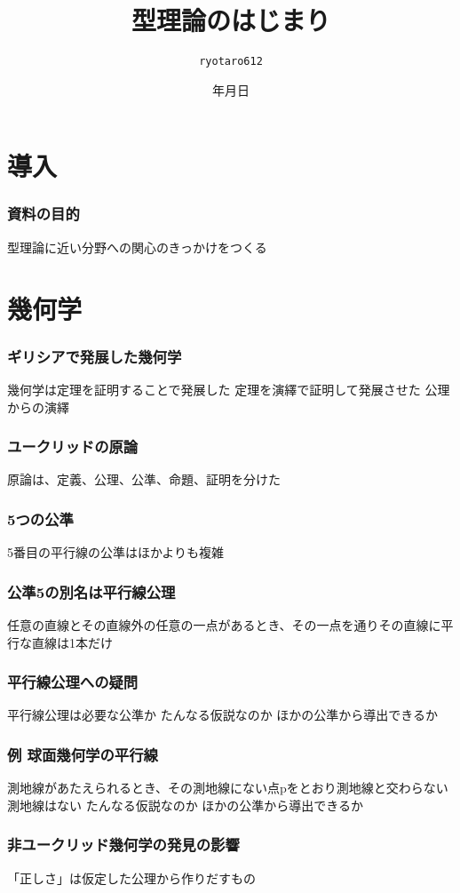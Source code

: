 \documentclass[unicode, 14pt, aspectratio=169]{beamer}
\date{\number\year 年\number\month 月\number\day 日}
\title{型理論のはじまり}
\author{\texttt{ryotaro612}}
\begin{document}
\begin{frame}
\titlepage
\end{frame}
\section{導入}
\begin{frame}
  \frametitle{資料の目的}
  {\large 型理論に近い分野への関心のきっかけをつくる}
\end{frame}
\section{幾何学}
\begin{frame}
  \frametitle{ギリシアで発展した幾何学}
  {\large 幾何学は定理を証明することで発展した}
  定理を演繹で証明して発展させた
  公理からの演繹
\end{frame}
\begin{frame}
  \frametitle{ユークリッドの原論}
  {\large 原論は、定義、公理、公準、命題、証明を分けた}
\end{frame}
\begin{frame}
  \frametitle{5つの公準}
  {\large 5番目の平行線の公準はほかよりも複雑}
\end{frame}
\begin{frame}
  \frametitle{公準5の別名は平行線公理}
  {\large 任意の直線とその直線外の任意の一点があるとき、その一点を通りその直線に平行な直線は1本だけ}
\end{frame}
\begin{frame}
  \frametitle{平行線公理への疑問}
  {\large 平行線公理は必要な公準か}
  たんなる仮説なのか
  ほかの公準から導出できるか
\end{frame}
\begin{frame}
  \frametitle{例 球面幾何学の平行線}
  {\large 測地線があたえられるとき、その測地線にない点pをとおり測地線と交わらない測地線はない}
  たんなる仮説なのか
  ほかの公準から導出できるか
\end{frame}
\begin{frame}
  \frametitle{非ユークリッド幾何学の発見の影響}
  {\large 「正しさ」は仮定した公理から作りだすもの}
\end{frame}
\end{document}
